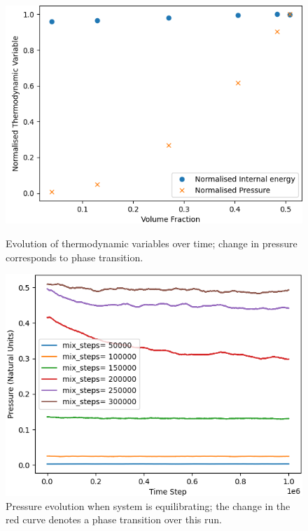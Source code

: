 \documentclass[11pt, a4paper]{article} %
\begin{document}
\begin{figure}[ht]
	\centering
	\begin{minipage}[b]{0.45\textwidth}
		\includegraphics[width=\linewidth]{Figures/phaseplot_frac_cubic}  
		\caption{Evolution of thermodynamic variables over time; change in pressure corresponds to phase transition.}
		\label{fig:cubic_pressure_phase}
	\end{minipage}
	\hfill
	\begin{minipage}[b]{0.45\textwidth}
		\includegraphics[width=\linewidth]{Figures/pressureplot_frac_cubic}  
		\caption{Pressure evolution when system is equilibrating; the change in the red curve denotes a phase transition over this run.}
		\label{fig:cubic_pressure_evo}
	\end{minipage}
\end{figure}
\end{document}
